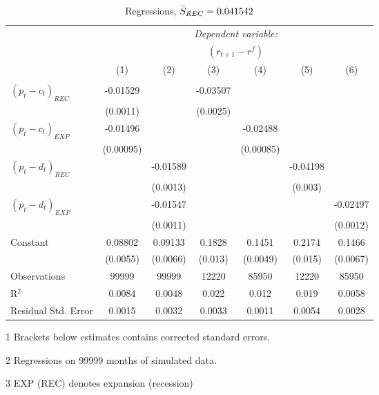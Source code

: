 \begin{table}[H]
\centering   
  \caption{Regressions, $\Bar{S}_{REC} = 0.041542$}           
  \label{tab:regress1}
  \begin{threeparttable}
\begin{tabular}{@{\hspace{5pt}}l@{\hspace{5pt}}cccccc} 
\toprule 
 & \multicolumn{6}{c}{\textit{Dependent variable:}} \\ 
 & \multicolumn{6}{c}{$\left(r_{t+1}-r^f\right)$} \\ 
 \cmidrule(rr){2-7}
 & (1) & (2) & (3) & (4) & (5) & (6) \\ 
\midrule  
\\[-2.1ex] $\left( p_t - c_t \right)_{REC}$ &-0.01529& &-0.03507 & & &\\ 
  & (0.0011) & &(0.0025) & & & \\ 
 \addlinespace 
  $\left( p_t - c_t \right)_{EXP}$ &-0.01496  &    & &-0.02488 & &  \\ 
  & (0.00095) & & &(0.00085) & & \\ 
 \addlinespace 
  $\left( p_t - d_t \right)_{REC}$ & &-0.01589& & & -0.04198  &   \\ 
                                   & &  (0.0013) & & & (0.003) &    \\ 
 \addlinespace 
  $\left( p_t - d_t \right)_{EXP}$ & &   -0.01547& & & &-0.02497 \\ 
                                   & &  (0.0011) & & & &(0.0012) \\ 
 \addlinespace 
 Constant &0.08802 &0.09133&0.1828 &0.1451 &0.2174 &0.1466 \\ 
          &(0.0055) &(0.0066)&(0.013)&(0.0049)&(0.015)&(0.0067) \\ 
 \addlinespace 
\midrule  
Observations & 99999 & 99999&12220 & 85950&12220&85950\\
R$^{2}$ &0.0084 & 0.0048&0.022&0.012&0.019&0.0058 \\ 
Residual Std. Error &0.0015 & 0.0032&0.0033&0.0011&0.0054&0.0028 \\ 
\bottomrule 
\end{tabular} 
\begin{tablenotes}
\footnotesize{
\item[1] Brackets below estimates contains \citet{NW87} corrected standard errors. 
\item[2] Regressions on 99999 months of simulated data.
\item[3] EXP (REC) denotes expansion (recession)
}
\end{tablenotes}
\end{threeparttable}
\end{table} 
